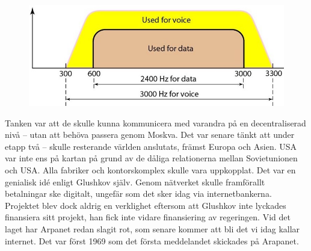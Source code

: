 \documentclass[a4paper,11pt]{article}
\begin{document}
\begin{figure}
  \centering
  \includegraphics[width=1.0\linewidth]{Bilder/bandbredd.jpg}
\end{figure}

Tanken var att de skulle kunna kommunicera med varandra på en decentraliserad
nivå -- utan att behöva passera genom Moskva. Det var senare tänkt att under
etapp två -- skulle resterande världen anslutats, främst Europa och Asien. USA
var inte ens på kartan på grund av de dåliga relationerna mellan Sovietunionen
och USA. Alla fabriker och kontorskomplex skulle vara uppkopplat. Det var en
genialisk idé enligt Glushkov själv. Genom nätverket skulle framförallt
betalningar ske digitalt, ungefär som det sker idag via internetbankerna.
Projektet blev dock aldrig en verklighet eftersom att Glushkov inte lyckades
finansiera sitt projekt, han fick inte vidare finansiering av regeringen. Vid
det laget har Arpanet redan slagit rot, som senare kommer att bli det vi idag
kallar internet. Det var först 1969 som det första meddelandet skickades på
Arapanet. 
\end{document}
